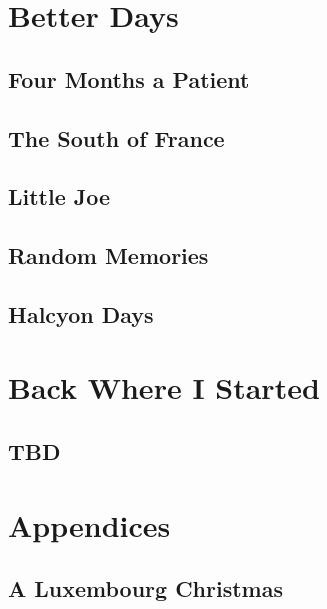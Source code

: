 \part{Better Days}\label{better-days}


\chapter{Four Months a Patient}\label{four-months-a-patient}


\chapter{The South of France}\label{the-south-of-france}


\chapter{Little Joe}\label{little-joe}


\chapter{Random Memories}\label{random-memories-2}


\chapter{Halcyon Days}\label{halcyon-days}


\part{Back Where I Started}\label{back-where-i-started}
\chapter{TBD}\label{return-sailing}


\part{Appendices}\label{appendices}
\chapter*{A Luxembourg Christmas}\label{luxembourg-christmas}


